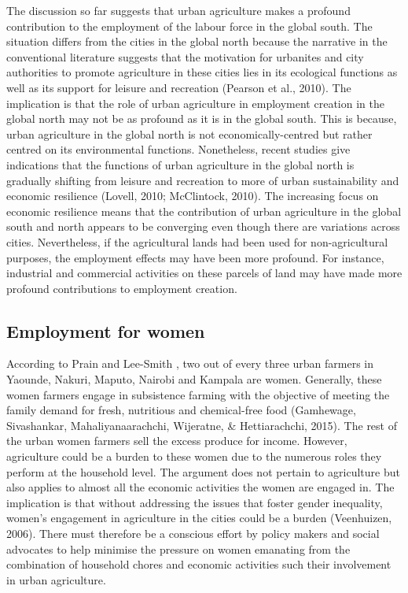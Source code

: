 The discussion so far suggests that urban agriculture makes a profound contribution to the employment of the labour force in the global south. The situation differs from the cities in the global north because the narrative in the conventional literature suggests that the motivation for urbanites and city authorities to promote agriculture in these cities lies in its ecological functions as well as its support for leisure and recreation (Pearson et al., 2010). The implication is that the role of urban agriculture in employment creation in the global north may not be as profound as it is in the global south. This is because, urban agriculture in the global north is not economically-centred but rather centred on its environmental functions. Nonetheless, recent studies give indications that the functions of urban agriculture in the global north is gradually shifting from leisure and recreation to more of urban sustainability and economic resilience (Lovell, 2010; McClintock, 2010). The increasing focus on economic resilience means that the contribution of urban agriculture in the global south and north appears to be converging even though there are variations across cities. Nevertheless, if the agricultural lands had been used for non-agricultural purposes, the employment effects may have been more profound. For instance, industrial and commercial activities on these parcels of land may have made more profound contributions to employment creation.

\subsection{Employment for women}

According to Prain and Lee-Smith \cite{Prain2010}, two out of every three urban farmers in Yaounde, Nakuri, Maputo, Nairobi and Kampala are women. Generally, these women farmers engage in subsistence farming with the objective of meeting the family demand for fresh, nutritious and chemical-free food (Gamhewage, Sivashankar, Mahaliyanaarachchi, Wijeratne, \& Hettiarachchi, 2015). The rest of the urban women farmers sell the excess produce for income. However, agriculture could be a burden to these women due to the numerous roles they perform at the household level. The argument does not pertain to agriculture but also applies to almost all the economic activities the women are engaged in. The implication is that without addressing the issues that foster gender inequality, women's engagement in agriculture in the cities could be a burden (Veenhuizen, 2006). There must therefore be a conscious effort by policy makers and social advocates to help minimise the pressure on women emanating from the combination of household chores and economic activities such their involvement in urban agriculture.

